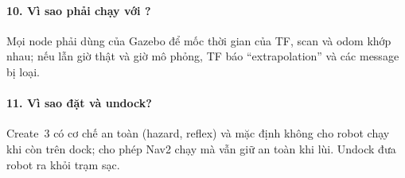 \paragraph{10. Vì sao phải chạy với ?} Mọi node phải dùng  của Gazebo để mốc thời gian của TF, scan và odom khớp nhau; nếu lẫn giờ thật và giờ mô phỏng, TF báo ``extrapolation'' và các message bị loại.

\paragraph{11. Vì sao đặt  và undock?} Create~3 có cơ chế an toàn (hazard, reflex) và mặc định không cho robot chạy khi còn trên dock;  cho phép Nav2 chạy mà vẫn giữ an toàn khi lùi. Undock đưa robot ra khỏi trạm sạc.
